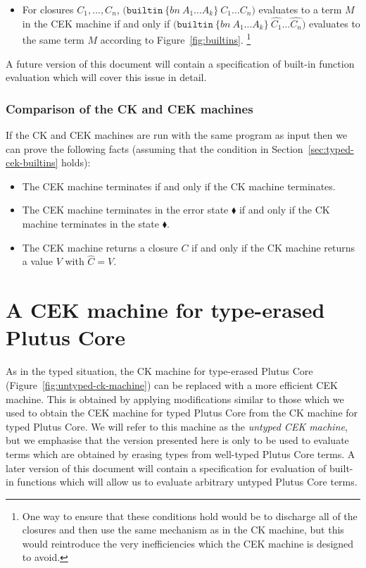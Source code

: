 \documentclass[a4paper]{article}
\newcommand{\keyword}[1]{\texttt{#1}}
\newcommand{\construct}[1]{\texttt{(} #1 \texttt{)}}
\newcommand\discharge[1]{\widehat{#1}}
\newcommand{\builtin}[3]{\construct{\keyword{builtin} ~ \texttt{\{} \mathit{#1} ~ #2 \texttt{\}} ~ #3}}
\begin{document}
\begin{appendices}
\begin{itemize}
\item For closures $C_1, \ldots, C_n$,
  $\builtin{bn}{A_1 \ldots A_k}{C_1 \ldots C_n}$
evaluates to a term $M$ in the CEK machine if and only if 
  $\builtin{bn}{A_1 \ldots A_k}{\discharge{C_1} \ldots \discharge{C_n}}$
evaluates to the same term $M$ according to Figure~\ref{fig:builtins}.%
\footnote{One way to ensure that these conditions hold would be to discharge all of the
closures and then use the same mechanism as in the CK machine, but this would
reintroduce the very inefficiencies which the CEK machine is designed to avoid.}

\end{itemize}
A future version of this document will contain a
specification of built-in function evaluation which will cover this
issue in detail.

\subsubsection{Comparison of the CK and CEK machines}
If the CK and CEK machines are run with the same program as input then
we can prove the following facts (assuming that the condition in
Section~\ref{sec:typed-cek-builtins} holds):
\begin{itemize}
\item The CEK machine terminates if and only if the CK machine terminates.
\item The CEK machine terminates in the error state $\blacklozenge$ if
and only if the CK machine terminates in the state $\blacklozenge$.
\item The CEK machine returns a closure $C$ if and only if the CK machine returns a
value $V$ with $\discharge{C} = V$.
\end{itemize}

\section{A CEK machine for type-erased Plutus Core}
\label{appendix:untyped-cek-machine}
As in the typed situation, the CK machine for type-erased Plutus Core
(Figure~\ref{fig:untyped-ck-machine}) can be replaced with a more
efficient CEK machine.  This is obtained by applying modifications
similar to those which we used to obtain the CEK machine for typed
Plutus Core from the CK machine for typed Plutus Core.  We will refer
to this machine as the \textit{untyped CEK machine}, but we emphasise
that the version presented here is only to be used to evaluate terms
which are obtained by erasing types from well-typed Plutus Core terms.
A later version of this document will contain a specification for
evaluation of built-in functions which will allow us to evaluate
arbitrary untyped Plutus Core terms.


\end{appendices}
\end{document}
